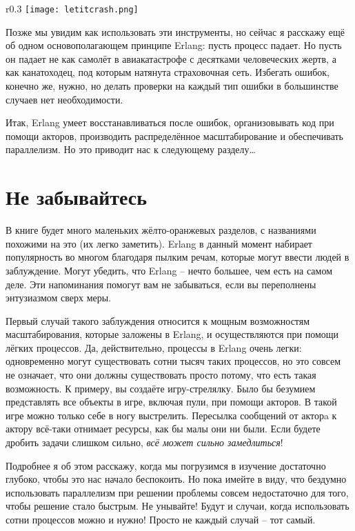 \begin{wrapfigure}{r}{0.3\linewidth}
    \texttt{[image: letitcrash.png]}
\end{wrapfigure}
Позже мы увидим как использовать эти инструменты, но сейчас я расскажу ещё об одном основополагающем принципе Erlang: пусть процесс падает.
Но пусть он падает не как самолёт в авиакатастрофе с десятками человеческих жертв, а как канатоходец, под которым натянута страховочная сеть.
Избегать ошибок, конечно же, нужно, но делать проверки на каждый тип ошибки в большинстве случаев нет необходимости.

Итак, Erlang умеет восстанавливаться после ошибок, организовывать код при помощи акторов, производить распределённое масштабирование и обеспечивать параллелизм.
Но это приводит нас к следующему разделу\ldots

\section{Не забывайтесь}
В книге будет много маленьких жёлто\--оранжевых разделов, с названиями похожими на это (их легко заметить).
Erlang в данный момент набирает популярность во многом благодаря пылким речам, которые могут ввести людей в заблуждение.
Могут убедить, что Erlang \--- нечто большее, чем есть на самом деле.
Эти напоминания помогут вам не забываться, если вы переполнены энтузиазмом сверх меры.

Первый случай такого заблуждения относится к мощным возможностям масштабирования, которые заложены в Erlang, и осуществляются при помощи лёгких процессов.
Да, действительно, процессы в Erlang очень легки: одновременно могут существовать сотни тысяч таких процессов, но это совсем не означает, что они должны существовать просто потому, что есть такая возможность.
К примеру, вы создаёте игру\--стрелялку.
Было бы безумием представлять все объекты в игре, включая пули, при помощи акторов.
В такой игре можно только себе в ногу выстрелить.
Пересылка сообщений от акторa к актору всё\--таки отнимает ресурсы, как бы малы они ни были.
Если будете дробить задачи слишком сильно, \emph{всё может сильно замедлиться}!

Подробнее я об этом расскажу, когда мы погрузимся в изучение достаточно глубоко, чтобы это нас начало беспокоить.
Но пока имейте в виду, что бездумно использовать параллелизм при решении проблемы совсем недостаточно для того, чтобы решение стало быстрым.
Не унывайте!
Будут и случаи, когда использовать сотни процессов можно и нужно!
Просто не каждый случай \--- тот самый.

